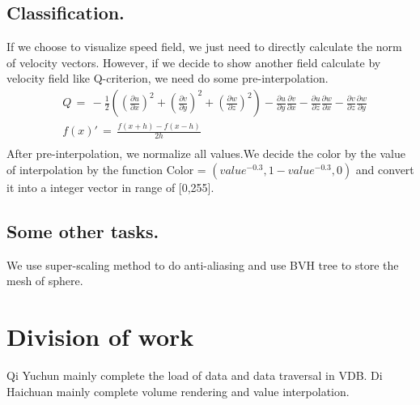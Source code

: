 \documentclass[acmtog]{acmart}
\begin{document}
	\subsection{Classification.}
	If we choose to visualize speed field, we just need to directly calculate the norm of velocity vectors. However, if we decide to show another field calculate by velocity field like Q-criterion, we need do some pre-interpolation.
	\begin{equation}
		\begin{split}
			&Q\,=\,-\frac{1}{2}((\frac{\partial u}{\partial x})^2+(\frac{\partial v}{\partial y})^2+(\frac{\partial w}{\partial z})^2)-\frac{\partial u}{\partial y}\frac{\partial v}{\partial x}-\frac{\partial u}{\partial z}\frac{\partial w}{\partial x}-\frac{\partial v}{\partial z}\frac{\partial w}{\partial y}\\
			&f(x)'\,=\,\frac{f(x+h)-f(x-h)}{2h} \\
		\end{split}		
	\end{equation}
	After pre-interpolation, we normalize all values.We decide the color by the value of interpolation by the function Color = $ (value^{-0.3},1-value^{-0.3},0) $ and convert it into a integer vector in range of [0,255].
	\subsection{Some other tasks.}
	We use super-scaling method to do anti-aliasing and use BVH tree to store the mesh of sphere.
	\section{Division of work}
	Qi Yuchun mainly complete the load of data and data traversal in VDB.
	Di Haichuan mainly complete volume rendering and value interpolation.
\end{document}

